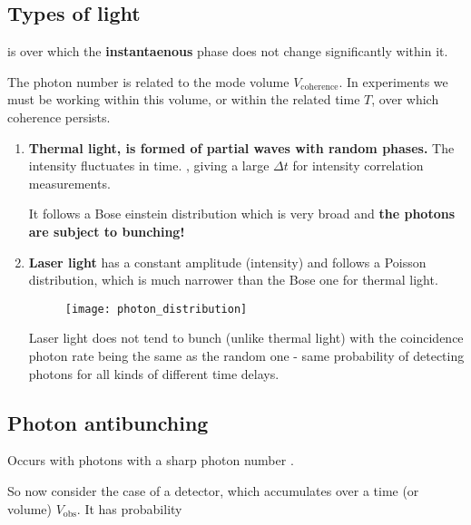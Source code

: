 \subsection{Types of light}
\begin{framed}\noindent
     is  over  which  the
  \textbf{instantaenous} phase does not change significantly within it.

  The    photon    number   is    related    to    the   mode    volume
  $ V_\text{coherence} $. In experiments we must be working within this
  volume,  or within  the  related time  $ T  $,  over which  coherence
  persists. 
\end{framed}
\begin{enumerate}
\item \textbf{Thermal  light, is  formed of  partial waves  with random
    phases.}  The intensity fluctuates  in time.  , giving  a  large $  \Delta  t $  for
  intensity correlation measurements.

  It  follows a  Bose einstein  distribution  which is  very broad  and
  \textbf{the photons are subject to bunching!}

\item  \textbf{Laser light}  has a  constant amplitude  (intensity) and
  follows a Poisson distribution, which  is much narrower than the Bose
  one for thermal light.

\begin{figure}[h]
  \centering%
  \texttt{[image: photon\_distribution]}
\end{figure}

\noindent

Laser light  does not  tend to  bunch (unlike  thermal light)  with the
coincidence  photon rate  being  the  same as  the  random  one -  same
probability  of  detecting photons  for  all  kinds of  different  time
delays.
\end{enumerate}

\subsection{Photon antibunching}
\begin{framed}\noindent
  Occurs with photons with a sharp photon number .
\end{framed}
So now consider  the case of a detector, which  accumulates over a time
(or volume) $ V_\text{obs} $. It has probability

